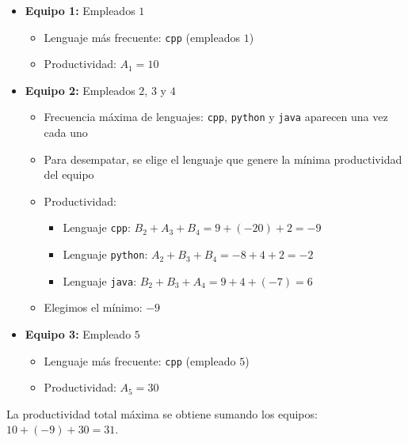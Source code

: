 \begin{itemize}
    \item \textbf{Equipo 1:} Empleados $1$
        \begin{itemize}
            \item Lenguaje más frecuente: \texttt{cpp} (empleados $1$)  
            \item Productividad: $A_1 = 10$
        \end{itemize}
    \item \textbf{Equipo 2:} Empleados $2$, $3$ y $4$
        \begin{itemize}
            \item Frecuencia máxima de lenguajes: \texttt{cpp}, \texttt{python} y \texttt{java} aparecen una vez cada uno  
            \item Para desempatar, se elige el lenguaje que genere la mínima productividad del equipo
            \item Productividad:  
            \begin{itemize}
                \item Lenguaje \texttt{cpp}: $B_2 + A_3 + B_4 = 9 + (-20) + 2 = -9$
                \item Lenguaje \texttt{python}: $A_2 + B_3 + B_4 = -8 + 4 + 2 = -2$
                \item Lenguaje \texttt{java}: $B_2 + B_3 + A_4 = 9 + 4 + (-7) = 6$
            \end{itemize}
            \item Elegimos el mínimo: $-9$
        \end{itemize}
    \item \textbf{Equipo 3:} Empleado $5$
        \begin{itemize}
            \item Lenguaje más frecuente: \texttt{cpp} (empleado $5$)  
            \item Productividad: $A_5 = 30$
        \end{itemize}
\end{itemize}

La productividad total máxima se obtiene sumando los equipos: $10 + (-9) + 30 = 31$.